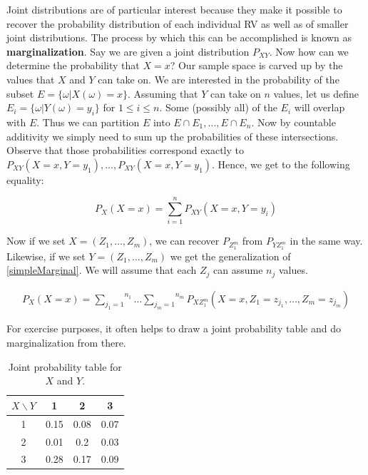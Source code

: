 \documentclass[a4paper,11pt,leqno]{report}
\begin{document}
Joint distributions are of particular interest because they make it possible to recover the probability distribution of each individual
RV as well as of smaller joint distributions. The process by which this can be accomplished is known as \textbf{marginalization}. Say
we are given a joint distribution $ P_{XY} $. Now how can we determine the probability that $ X=x $? Our sample space is carved
up by the values that $ X $ and $ Y $ can take on. We are interested in the probability of the subset $ E = \{\omega|X(\omega)=x\} $.
Assuming that $ Y $ can take on $ n $ values, let us define $ E_{i} = \{\omega| Y(\omega) = y_{i}\} $ for $ 1 \leq i \leq n $.
Some (possibly all) of the $ E_{i} $ will overlap with $ E $. Thus we can partition $ E $ into $ E\cap E_{1}, \ldots, E \cap E_{n} $.
Now by countable additivity we simply need to sum up the probabilities of these intersections. Observe that those probabilities
correspond exactly to $ P_{XY}(X=x,Y=y_{1}), \ldots, P_{XY}(X=x,Y=y_{1}) $. Hence, we get to the following equality:

\begin{equation} \label{simpleMarginal}
P_{X}(X=x) = \overset{n}{\underset{i=1}{\sum}} P_{XY}(X=x,Y=y_{i}) 
\end{equation}

Now if we set $ X = (Z_{1}, \ldots, Z_{m}) $, we can recover $ P_{Z_{1}^{m}} $ from $ P_{YZ_{1}^{m}} $ in the same way. Likewise,
if we set $ Y = (Z_{1}, \ldots, Z_{m}) $ we get the generalization of \ref{simpleMarginal}. We will assume that each $ Z_{j} $
can assume $ n_{j} $ values.

\begin{align}
P_{X}(X=x) = \overset{n_{1}}{\underset{j_{1}=1}{\sum}}\ldots \overset{n_{m}}{\underset{j_{m}=1}{\sum}} 
P_{XZ_{1}^{m}}(X=x,Z_{1}=z_{j_{1}}, \ldots, Z_{m}=z_{j_{m}})
\end{align}

For exercise purposes, it often helps to draw a joint probability table and do marginalization from there.

\begin{table}
\center
\begin{tabular}{|c|c|c|c|}
\hline
$X\backslash Y$	& 1		& 2		& 3		\\
\hline
1				& 0.15	& 0.08	& 0.07	\\
2				& 0.01	& 0.2	& 0.03	\\	
3				& 0.28	& 0.17	& 0.09	\\
\hline
\end{tabular}
\caption{Joint probability table for $ X $ and $ Y $.}
\label{jointTable}
\end{table}
\end{document}
